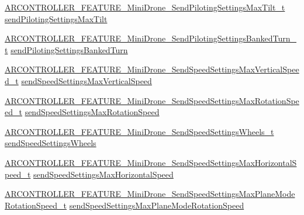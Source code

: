 \begin{DoxyCompactItemize}
\item 
\hyperlink{_a_r_c_o_n_t_r_o_l_l_e_r___feature_8h_afb203be7739653d7174bf04124e67bee}{A\+R\+C\+O\+N\+T\+R\+O\+L\+L\+E\+R\+\_\+\+F\+E\+A\+T\+U\+R\+E\+\_\+\+Mini\+Drone\+\_\+\+Send\+Piloting\+Settings\+Max\+Tilt\+\_\+t} \hyperlink{struct_a_r_c_o_n_t_r_o_l_l_e_r___f_e_a_t_u_r_e___mini_drone__t_a86f25b127c95629e0558b2a39592bf8b}{send\+Piloting\+Settings\+Max\+Tilt}
\item 
\hyperlink{_a_r_c_o_n_t_r_o_l_l_e_r___feature_8h_a7f57926be54a00ca8adc89c091af9738}{A\+R\+C\+O\+N\+T\+R\+O\+L\+L\+E\+R\+\_\+\+F\+E\+A\+T\+U\+R\+E\+\_\+\+Mini\+Drone\+\_\+\+Send\+Piloting\+Settings\+Banked\+Turn\+\_\+t} \hyperlink{struct_a_r_c_o_n_t_r_o_l_l_e_r___f_e_a_t_u_r_e___mini_drone__t_a70d09c6353f2b10c55fbc084b2f2cadb}{send\+Piloting\+Settings\+Banked\+Turn}
\item 
\hyperlink{_a_r_c_o_n_t_r_o_l_l_e_r___feature_8h_a6398adf0d1e3485610b5f39c388586c3}{A\+R\+C\+O\+N\+T\+R\+O\+L\+L\+E\+R\+\_\+\+F\+E\+A\+T\+U\+R\+E\+\_\+\+Mini\+Drone\+\_\+\+Send\+Speed\+Settings\+Max\+Vertical\+Speed\+\_\+t} \hyperlink{struct_a_r_c_o_n_t_r_o_l_l_e_r___f_e_a_t_u_r_e___mini_drone__t_a130bd1fd999f97e332d964d7a764052b}{send\+Speed\+Settings\+Max\+Vertical\+Speed}
\item 
\hyperlink{_a_r_c_o_n_t_r_o_l_l_e_r___feature_8h_a2f9103ce12614ce9c299b54e1c527712}{A\+R\+C\+O\+N\+T\+R\+O\+L\+L\+E\+R\+\_\+\+F\+E\+A\+T\+U\+R\+E\+\_\+\+Mini\+Drone\+\_\+\+Send\+Speed\+Settings\+Max\+Rotation\+Speed\+\_\+t} \hyperlink{struct_a_r_c_o_n_t_r_o_l_l_e_r___f_e_a_t_u_r_e___mini_drone__t_a23ad99b12c76a5d414220a62774b41c9}{send\+Speed\+Settings\+Max\+Rotation\+Speed}
\item 
\hyperlink{_a_r_c_o_n_t_r_o_l_l_e_r___feature_8h_a11f2690a732f85d1ca06fd9c9213ae2d}{A\+R\+C\+O\+N\+T\+R\+O\+L\+L\+E\+R\+\_\+\+F\+E\+A\+T\+U\+R\+E\+\_\+\+Mini\+Drone\+\_\+\+Send\+Speed\+Settings\+Wheels\+\_\+t} \hyperlink{struct_a_r_c_o_n_t_r_o_l_l_e_r___f_e_a_t_u_r_e___mini_drone__t_a9ab09a9b333b78dbcccea7a495b9bb14}{send\+Speed\+Settings\+Wheels}
\item 
\hyperlink{_a_r_c_o_n_t_r_o_l_l_e_r___feature_8h_acd8aee420e3144db6d2fe7775dec9f23}{A\+R\+C\+O\+N\+T\+R\+O\+L\+L\+E\+R\+\_\+\+F\+E\+A\+T\+U\+R\+E\+\_\+\+Mini\+Drone\+\_\+\+Send\+Speed\+Settings\+Max\+Horizontal\+Speed\+\_\+t} \hyperlink{struct_a_r_c_o_n_t_r_o_l_l_e_r___f_e_a_t_u_r_e___mini_drone__t_a836fc2c5318b06c6ed38c50074d9e2b3}{send\+Speed\+Settings\+Max\+Horizontal\+Speed}
\item 
\hyperlink{_a_r_c_o_n_t_r_o_l_l_e_r___feature_8h_a97e1fecb5105d0cfa630af01473578d0}{A\+R\+C\+O\+N\+T\+R\+O\+L\+L\+E\+R\+\_\+\+F\+E\+A\+T\+U\+R\+E\+\_\+\+Mini\+Drone\+\_\+\+Send\+Speed\+Settings\+Max\+Plane\+Mode\+Rotation\+Speed\+\_\+t} \hyperlink{struct_a_r_c_o_n_t_r_o_l_l_e_r___f_e_a_t_u_r_e___mini_drone__t_a097a7f4762ecc17b6ff8b6e6d1be89ac}{send\+Speed\+Settings\+Max\+Plane\+Mode\+Rotation\+Speed}

\end{DoxyCompactItemize}
